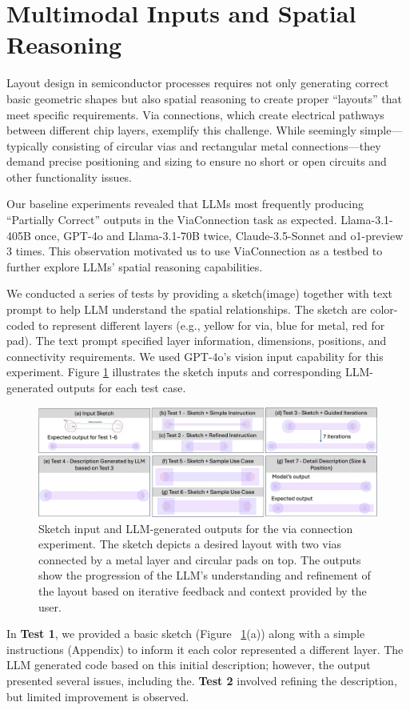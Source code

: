 \documentclass{article}
\begin{document}
\section{Multimodal Inputs and Spatial Reasoning}
Layout design in semiconductor processes requires not only generating correct basic geometric shapes but also spatial reasoning to create proper ``layouts'' that meet specific requirements. Via connections, which create electrical pathways between different chip layers, exemplify this challenge. While seemingly simple—typically consisting of circular vias and rectangular metal connections—they demand precise positioning and sizing to ensure no short or open circuits and other functionality issues.

Our baseline experiments revealed that LLMs most frequently producing ``Partially Correct'' outputs in the ViaConnection task as expected. Llama-3.1-405B once, GPT-4o and Llama-3.1-70B twice, Claude-3.5-Sonnet and o1-preview 3 times. This observation motivated us to use ViaConnection as a testbed to further explore LLMs' spatial reasoning capabilities.

We conducted a series of tests by providing a sketch(image) together with text prompt to help LLM understand the spatial relationships. The sketch are color-coded to represent different layers (e.g., yellow for via, blue for metal, red for pad). The text prompt specified layer information, dimensions, positions, and connectivity requirements. We used GPT-4o's vision input capability for this experiment. Figure \ref{fig:via_experiment} illustrates the sketch inputs and corresponding LLM-generated outputs for each test case.

\begin{figure}[!h]
\centering
\includegraphics[width=1\linewidth]{Figure1_v4.png}
\caption{Sketch input and LLM-generated outputs for the via connection experiment. The sketch depicts a desired layout with two vias connected by a metal layer and circular pads on top. The outputs show the progression of the LLM's understanding and refinement of the layout based on iterative feedback and context provided by the user.}
\label{fig:via_experiment}
\end{figure}
In \textbf{Test 1}, we provided a basic sketch (Figure ~\ref{fig:via_experiment}(a)) along with a simple instructions (Appendix) to inform it each color represented a different layer. The LLM generated code based on this initial description; however, the output presented several issues, including the. \textbf{Test 2} involved refining the description, but limited improvement is observed. 
\end{document}
